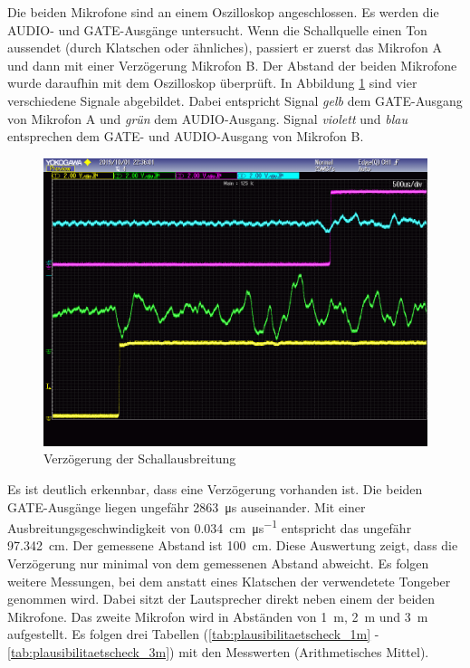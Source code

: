 Die beiden Mikrofone sind an einem Oszilloskop angeschlossen. Es werden die \si{AUDIO}- und \si{GATE}-Ausgänge untersucht. Wenn die Schallquelle einen Ton aussendet (durch Klatschen oder ähnliches), passiert er zuerst das Mikrofon A und dann mit einer Verzögerung Mikrofon B. Der Abstand der beiden Mikrofone wurde daraufhin mit dem Oszilloskop überprüft. In Abbildung \ref{img:plausibilitaetscheck_oszi} sind vier verschiedene Signale abgebildet. Dabei entspricht Signal \textit{gelb} dem \si{GATE}-Ausgang von Mikrofon A und \textit{grün} dem \si{AUDIO}-Ausgang. Signal \textit{violett} und \textit{blau} entsprechen dem \si{GATE}- und \si{AUDIO}-Ausgang von Mikrofon B.

\begin{figure}[H]
        \centering
        \hspace*{-1.9cm}
        \includegraphics[width=1.2\textwidth]{images/plausibilitaetscheck_oszi.png}
        \caption{Verzögerung der Schallausbreitung}
        \label{img:plausibilitaetscheck_oszi}
\end{figure}

Es ist deutlich erkennbar, dass eine Verzögerung vorhanden ist. Die beiden \si{GATE}-Ausgänge liegen ungefähr \SI{2863}{\micro \second} auseinander. Mit einer Ausbreitungsgeschwindigkeit von \SI{0,034}{\centi\metre\per\micro\second} entspricht das ungefähr \SI{97,342}{\centi\metre}. Der gemessene Abstand ist \SI{100}{\centi\metre}. Diese Auswertung zeigt, dass die Verzögerung nur minimal von dem gemessenen Abstand abweicht. Es folgen weitere Messungen, bei dem anstatt eines Klatschen der verwendetete Tongeber genommen wird. Dabei sitzt der Lautsprecher direkt neben einem der beiden Mikrofone. Das zweite Mikrofon wird in Abständen von \SI{1}{\metre}, \SI{2}{\metre} und \SI{3}{\metre} aufgestellt. Es folgen drei Tabellen (\ref{tab:plausibilitaetscheck_1m} - \ref{tab:plausibilitaetscheck_3m}) mit den Messwerten (Arithmetisches Mittel).

